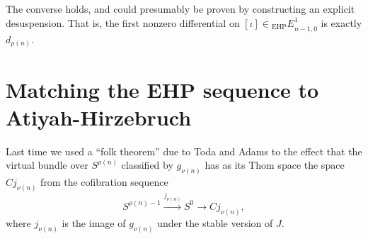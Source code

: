 The converse holds, and could presumably be proven by constructing an explicit desuspension. That is, the first nonzero differential on $[\iota]\in {_\text{EHP}E}^1_{n-1,0}$ is exactly $d_{\rho(n)}$.
\fi
\BoxedNote{}






\section{Matching the EHP sequence to Atiyah-Hirzebruch} %
\label{MatchingTheEHPSStoAtiyahHirzebruck}
\ifx\OutputMatchingTheEHPSStoAtiyahHirzebruck\undefined\else
Last time we used a ``folk theorem'' due to Toda and Adams to the effect that the virtual bundle over $S^{\rho(n)}$ classified by $g_{\nu(n)}$ has as its Thom space the space $Cj_{\nu(n)}$ from the cofibration sequence
\[
S^{\rho(n) - 1} \stackrel{j_{\nu(n)}}{\to} S^0 \to Cj_{\nu(n)}
,\]
where $j_{\nu(n)}$ is the image of $g_{\nu(n)}$ under the stable version of $J$.

